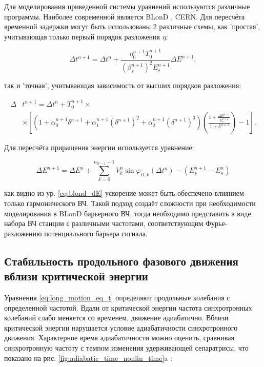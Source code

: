 \noindent Для моделирования приведенной системы уравнений используются различные программы. Наиболее современной является BLonD \cite{blond}, CERN. Для пересчёта временной задержки могут быть использованы 2 различные схемы, как 'простая', учитывающая только первый порядок разложения $\eta$:

\begin{equation}
\Delta t^{n+1}=\Delta t^n+\frac{\eta_0^{n+1} T_0^{n+1}}{\left(\beta_s^{n+1}\right)^2 E_s^{n+1}} \Delta E^{n+1},
\label{eq:blond_dt_simple}
\end{equation}

\noindent так и 'точная', учитывающая зависимость от высших порядков разложения: 

\begin{equation} \label{eq:blond_dt_exact}
\begin{aligned}
 \Delta & t^{n+1}=\Delta t^n+T_0^{n+1}\times\\
& \times \left[\left(1+\alpha_0^{n+1} \delta^{n+1}+\alpha_1^{n+1}\left(\delta^{n+1}\right)^2+
\alpha_2^{n+1}\left(\delta^{n+1}\right)^3\right)\left(\frac{1+\frac{\Delta E^{n+1}}{E_s^{n+1}}}{1+\delta^{n+1}}\right)-1\right].
\end{aligned}
\end{equation}

\noindent Для пересчёта приращения энергии используется уравнение:

\begin{equation} \label{eq:blond_dE}
\Delta E^{n+1}=\Delta E^n+\sum_{k=0}^{n_{\mathrm{rf}-1}-1} V_k^n \sin \varphi_{\mathrm{rf}, k}\left(\Delta t^n\right)-\left(E_s^{n+1}-E_s^n\right)
\end{equation}

\noindent как видно из ур. \ref{eq:blond_dE} ускорение может быть обеспечено влиянием только гармонического ВЧ. Такой подход создаёт сложности при необходимости моделирования в BLonD барьерного ВЧ, тогда необходимо представить в виде набора ВЧ станции с различными частотами, соответствующим Фурье-разложению потенциального барьера сигнала.
	
	\subsection{Стабильность продольного фазового движения вблизи критической энергии}\label{sec:transition_jump/adiabaticity}
	
\par Уравнения \ref{eq:long_motion_eq_t} определяют продольные колебания с определенной частотой. Вдали от критической энергии частота синхротронных колебаний слабо меняется со временем, движение адиабатично. Вблизи критической энергии нарушается условие адиабатичности синхротронного движения. Характерное время адиабатичности можно оценить, сравнивая синхротронную частоту с темпом изменения удерживающей сепаратрисы, что показано на рис. \ref{fig:adiabatic_time_nonlin_time}a \cite{ng}:

